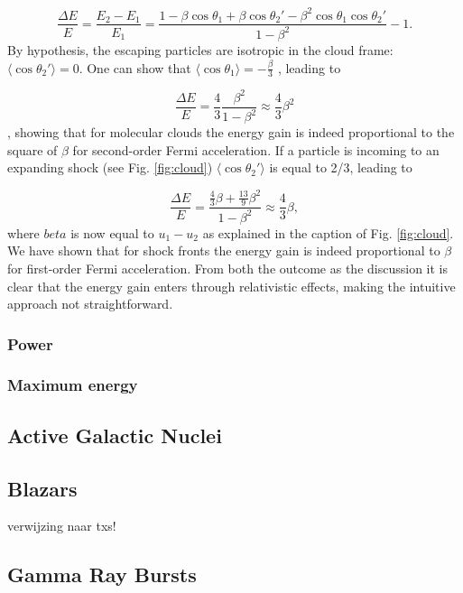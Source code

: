 \begin{equation}
\frac{\Delta E}{E} = \frac{E_2 -E_1}{E_1} = \frac{1 - 
\beta \cos \theta_1 + \beta \cos \theta_2' - \beta^2 \cos \theta_1 \cos \theta_2'}{1-\beta^2} -1.
\end{equation}
By hypothesis, the escaping particles are isotropic in the cloud frame: $\langle \cos \theta_2' \rangle = 0$. One can show that $\langle \cos \theta_1 \rangle = -\frac{\beta}{3}$ \cite{Gaisser:2016uoy}, leading to

\begin{equation}
\frac{\Delta E}{E} = \frac{4}{3} \frac{\beta^2}{1-\beta^2} \approx \frac{4}{3} \beta^2
\end{equation},
showing that for molecular clouds the energy gain is indeed proportional to the square of $\beta$ for second-order Fermi acceleration.
\newline
If a particle is incoming to an expanding shock (see Fig. \ref{fig:cloud}) $\langle \cos \theta_2'\rangle$ is equal to 2/3, leading to

\begin{equation}
\frac{\Delta E}{E} = \frac{\frac{4}{3}\beta + \frac{13}{9}\beta^2}{1-\beta^2} \approx \frac{4}{3} \beta,
\end{equation}
where $beta$ is now equal to $u_1 -u_2$ as explained in the caption of Fig. \ref{fig:cloud}. We have shown that for shock fronts the energy gain is indeed proportional to $\beta$ for first-order Fermi acceleration. From both the outcome as the discussion it is clear that the energy gain enters through relativistic effects, making the intuitive approach not straightforward.
\subsubsection{Power}
\subsubsection{Maximum energy}
\label{subsubsec:maxenergy}
\subsection{Active Galactic Nuclei}
\subsection{Blazars}
verwijzing naar txs!
\subsection{Gamma Ray Bursts}


